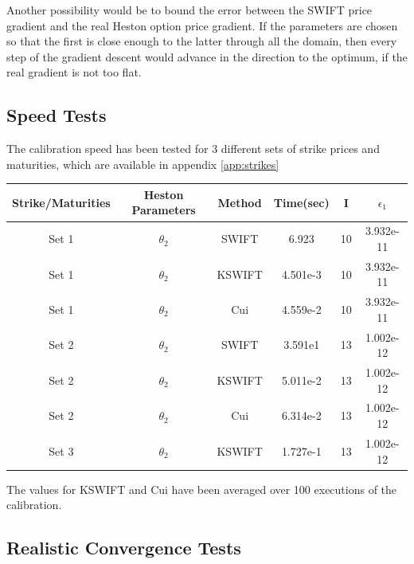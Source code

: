 \documentclass[12,twoside]{mammeTFM}
\theoremstyle{definition}
\theoremstyle{remark}
\begin{document}
Another possibility would be to bound the error between the SWIFT price gradient and the real Heston option price gradient. If the parameters are chosen so that the first is close enough to the latter through all the domain, then every step of the gradient descent would advance in the direction to the optimum, if the real gradient is not too flat.

\subsection{Speed Tests}

The calibration speed has been tested for 3 different sets of strike prices and maturities, which are available in appendix \ref{app:strikes}

\begin{center}
 \begin{tabular}{|c | c | c | c | c | c |} 
 \hline
 Strike/Maturities & Heston Parameters & Method & Time(sec) & I & $\epsilon_1$ \\ [0.5ex] 
 \hline
 Set 1 & $\theta_2$ & SWIFT & 6.923 & 10 & 3.932e-11 \\ 
 \hline
 Set 1 & $\theta_2$ & KSWIFT & 4.501e-3 & 10 & 3.932e-11 \\
 \hline
 Set 1 & $\theta_2$ & Cui & 4.559e-2 & 10 & 3.932e-11 \\
 \hline
 Set 2 & $\theta_2$ & SWIFT & 3.591e1 & 13 & 1.002e-12 \\
 \hline
 Set 2 & $\theta_2$ & KSWIFT & 5.011e-2 & 13 & 1.002e-12 \\
 \hline
 Set 2 & $\theta_2$ & Cui & 6.314e-2 & 13 & 1.002e-12 \\
 \hline
 Set 3 & $\theta_2$ & KSWIFT  & 1.727e-1 & 13 & 1.002e-12\\
 \hline
\end{tabular}
\end{center}

The values for KSWIFT and Cui have been averaged over 100 executions of the calibration.

\subsection{Realistic Convergence Tests}
\end{document}
